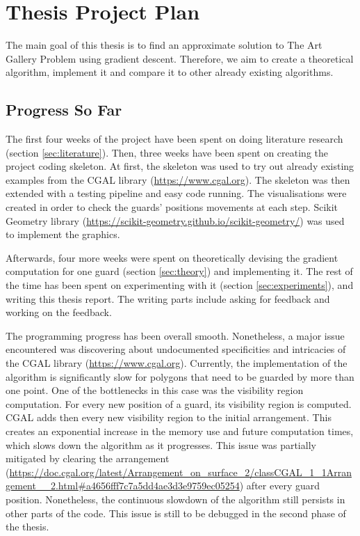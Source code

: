 \section{Thesis Project Plan}
\label{sec:thesis}
The main goal of this thesis is to find an approximate solution to The Art Gallery Problem \cite{o1987art} using gradient descent. Therefore, we aim to create a theoretical algorithm, implement it and compare it to other already existing algorithms.

\subsection{Progress So Far}
The first four weeks of the project have been spent on doing literature research (section \ref{sec:literature}). Then, three weeks have been spent on creating the project coding skeleton. At first, the skeleton was used to try out already existing examples from the CGAL library (\url{https://www.cgal.org}). The skeleton was then extended with a testing pipeline and easy code running. The visualisations were created in order to check the guards' positions movements at each step. Scikit Geometry library (\url{https://scikit-geometry.github.io/scikit-geometry/}) was used to implement the graphics.

Afterwards, four more weeks were spent on theoretically devising the gradient computation for one guard (section \ref{sec:theory}) and implementing it. The rest of the time has been spent on experimenting with it (section \ref{sec:experiments}), and writing this thesis report. The writing parts include asking for feedback and working on the feedback.

The programming progress has been overall smooth. Nonetheless, a major issue encountered was discovering about undocumented specificities and intricacies of the CGAL library (\url{https://www.cgal.org}). 
Currently, the implementation of the algorithm is significantly slow for polygons that need to be guarded by more than one point. One of the bottlenecks in this case was the visibility region computation. For every new position of a guard, its visibility region is computed. CGAL adds then every new visibility region to the initial arrangement. This creates an exponential increase in the memory use and future computation times, which slows down the algorithm as it progresses. This issue was partially mitigated by clearing the arrangement (\url{https://doc.cgal.org/latest/Arrangement_on_surface_2/classCGAL_1_1Arrangement__2.html#a4656fff7c7a5dd4ae3d3e9759ec05254}) after every guard position.
Nonetheless, the continuous slowdown of the algorithm still persists in other parts of the code. This issue is still to be debugged in the second phase of the thesis. 

